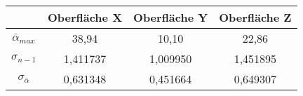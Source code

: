 \begin{tabular}{c|c|c|c}
    \space & Oberfläche X & Oberfläche Y & Oberfläche Z \\ \hline
    $\bar{\alpha}_{max}$ & 38,94 & 10,10 & 22,86 \\
    $\sigma_{n-1}$ & 1,411737 & 1,009950 & 1,451895 \\
    $\sigma_{\bar{\alpha}}$ & 0,631348 & 0,451664 & 0,649307 \\
\end{tabular}